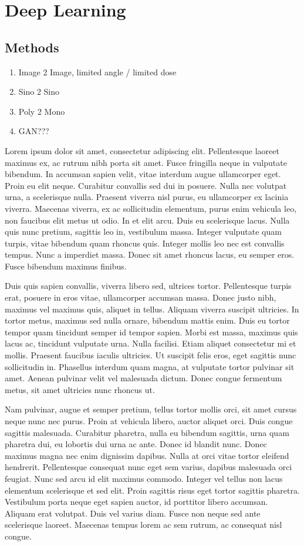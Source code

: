 \chapter{Deep Learning}
\section{Methods}

\begin{enumerate}
\item Image 2 Image, limited angle / limited dose
\item Sino 2 Sino
\item Poly 2 Mono
\item GAN???
\end{enumerate}

Lorem ipsum dolor sit amet, consectetur adipiscing elit. Pellentesque laoreet maximus ex, ac rutrum nibh porta sit amet. Fusce fringilla neque in vulputate bibendum. In accumsan sapien velit, vitae interdum augue ullamcorper eget. Proin eu elit neque. Curabitur convallis sed dui in posuere. Nulla nec volutpat urna, a scelerisque nulla. Praesent viverra nisl purus, eu ullamcorper ex lacinia viverra. Maecenas viverra, ex ac sollicitudin elementum, purus enim vehicula leo, non faucibus elit metus ut odio. In et elit arcu. Duis eu scelerisque lacus. Nulla quis nunc pretium, sagittis leo in, vestibulum massa. Integer vulputate quam turpis, vitae bibendum quam rhoncus quis. Integer mollis leo nec est convallis tempus. Nunc a imperdiet massa. Donec sit amet rhoncus lacus, eu semper eros. Fusce bibendum maximus finibus.

Duis quis sapien convallis, viverra libero sed, ultrices tortor. Pellentesque turpis erat, posuere in eros vitae, ullamcorper accumsan massa. Donec justo nibh, maximus vel maximus quis, aliquet in tellus. Aliquam viverra suscipit ultricies. In tortor metus, maximus sed nulla ornare, bibendum mattis enim. Duis eu tortor tempor quam tincidunt semper id tempor sapien. Morbi est massa, maximus quis lacus ac, tincidunt vulputate urna. Nulla facilisi. Etiam aliquet consectetur mi et mollis. Praesent faucibus iaculis ultricies. Ut suscipit felis eros, eget sagittis nunc sollicitudin in. Phasellus interdum quam magna, at vulputate tortor pulvinar sit amet. Aenean pulvinar velit vel malesuada dictum. Donec congue fermentum metus, sit amet ultricies nunc rhoncus ut.

Nam pulvinar, augue et semper pretium, tellus tortor mollis orci, sit amet cursus neque nunc nec purus. Proin at vehicula libero, auctor aliquet orci. Duis congue sagittis malesuada. Curabitur pharetra, nulla eu bibendum sagittis, urna quam pharetra dui, eu lobortis dui urna ac ante. Donec id blandit nunc. Donec maximus magna nec enim dignissim dapibus. Nulla at orci vitae tortor eleifend hendrerit. Pellentesque consequat nunc eget sem varius, dapibus malesuada orci feugiat. Nunc sed arcu id elit maximus commodo. Integer vel tellus non lacus elementum scelerisque et sed elit. Proin sagittis risus eget tortor sagittis pharetra. Vestibulum porta neque eget sapien auctor, id porttitor libero accumsan. Aliquam erat volutpat. Duis vel varius diam. Fusce non neque sed ante scelerisque laoreet. Maecenas tempus lorem ac sem rutrum, ac consequat nisl congue.

